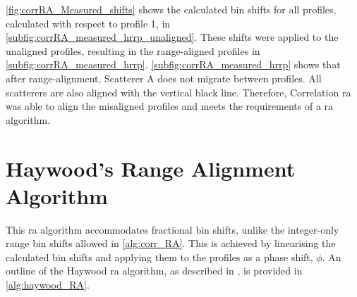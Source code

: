\documentclass[class=report,11pt,crop=false]{standalone}
\begin{document}
    \autoref{fig:corrRA_Measured_shifts} shows the calculated bin shifts for all profiles, calculated with respect to profile 1, in \autoref{subfig:corrRA_measured_hrrp_unaligned}. These shifts were applied to the unaligned profiles, resulting in the range-aligned profiles in \autoref{subfig:corrRA_measured_hrrp}. \autoref{subfig:corrRA_measured_hrrp} shows that after range-alignment, Scatterer A does not migrate between profiles. All scatterers are also aligned with the vertical black line. Therefore, Correlation \gls{ra} was able to align the misaligned profiles and meets the requirements of a \gls{ra} algorithm.
    
\section{Haywood's Range Alignment Algorithm}\label{subsec:HayRA}
This \gls{ra} algorithm accommodates fractional bin shifts, unlike the integer-only range bin shifts allowed in \autoref{alg:corr_RA}. This is achieved by linearising the calculated bin shifts and applying them to the profiles as a phase shift, $\phi$. An outline of the Haywood \gls{ra} algorithm, as described in \cite{haywood_RA_AF,zyweck}, is provided in \autoref{alg:haywood_RA}.
\end{document}

